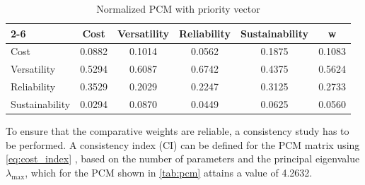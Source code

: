 \begin{table}[h!]
\centering
\caption{Normalized PCM with priority vector}
\renewcommand{\arraystretch}{1.2}

\begin{tabular}{|l||c|c|c|c||c|}
\cline{2-6}
\multicolumn{1}{r||}{} 
& Cost & Versatility & Reliability & Sustainability & \textbf{w} \\
\hline\hline

Cost           & 0.0882 & 0.1014 & 0.0562 & 0.1875 & 0.1083 \\\hline
Versatility    & 0.5294 & 0.6087 & 0.6742 & 0.4375 & 0.5624 \\\hline
Reliability    & 0.3529 & 0.2029 & 0.2247 & 0.3125 & 0.2733 \\\hline
Sustainability & 0.0294 & 0.0870 & 0.0449 & 0.0625 & 0.0560 \\\hline

\end{tabular}
\label{tab:pcm_norm}
\end{table}

To ensure that the comparative weights are reliable, a consistency study has to be performed. A consistency index (CI) can be defined for the PCM matrix using \autoref{eq:cost_index} \cite{SAATY19909}, based on the number of parameters and the principal eigenvalue $\lambda_\text{max}$, which for the PCM shown in \autoref{tab:pcm} attains a value of 4.2632.

